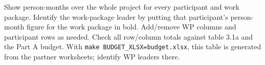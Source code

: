 \label{tab:staff-effort}
\begin{heguidance}
Show person-months over the whole project for every participant and work
package. Identify the work-package leader by putting that participant's
person-month figure for the work package in bold. Add/remove WP columns and
participant rows as needed. Check all row/column totals against table 3.1a and
the Part A budget. With \texttt{make BUDGET\_XLSX=budget.xlsx}, this table is
generated from the partner worksheets; identify WP leaders there.
\end{heguidance}
\HEStaffEffortTable

